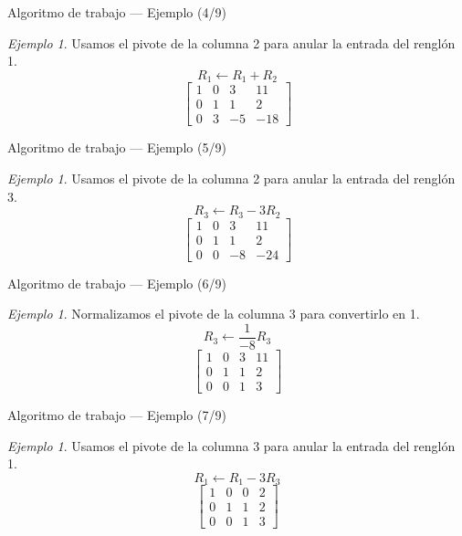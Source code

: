 \documentclass[aspectratio=169,11pt]{beamer}
\theoremstyle{remark}
\newtheorem{Ejem}[definicion]{Ejemplo}
\begin{document}
\begin{frame}{Algoritmo de trabajo — Ejemplo (4/9)}
\begin{Ejem}
Usamos el pivote de la columna 2 para anular la entrada del renglón 1.
\[
R_{1}\leftarrow R_{1}+R_{2}
\]
\[
\left[\begin{array}{ccc|c}
1 & 0 & 3 & 11\\
0 & 1 & 1 & 2\\
0 & 3 & -5 & -18
\end{array}\right]
\]
\end{Ejem}
\end{frame}

\begin{frame}{Algoritmo de trabajo — Ejemplo (5/9)}
\begin{Ejem}
Usamos el pivote de la columna 2 para anular la entrada del renglón 3.
\[
R_{3}\leftarrow R_{3}-3R_{2}
\]
\[
\left[\begin{array}{ccc|c}
1 & 0 & 3 & 11\\
0 & 1 & 1 & 2\\
0 & 0 & -8 & -24
\end{array}\right]
\]
\end{Ejem}
\end{frame}

\begin{frame}{Algoritmo de trabajo — Ejemplo (6/9)}
\begin{Ejem}
Normalizamos el pivote de la columna 3 para convertirlo en 1.
\[
R_{3}\leftarrow \frac{1}{-8}R_{3}
\]
\[
\left[\begin{array}{ccc|c}
1 & 0 & 3 & 11\\
0 & 1 & 1 & 2\\
0 & 0 & 1 & 3
\end{array}\right]
\]
\end{Ejem}
\end{frame}

\begin{frame}{Algoritmo de trabajo — Ejemplo (7/9)}
\begin{Ejem}
Usamos el pivote de la columna 3 para anular la entrada del renglón 1.
\[
R_{1}\leftarrow R_{1}-3R_{3}
\]
\[
\left[\begin{array}{ccc|c}
1 & 0 & 0 & 2\\
0 & 1 & 1 & 2\\
0 & 0 & 1 & 3
\end{array}\right]
\]
\end{Ejem}
\end{frame}
\end{document}
